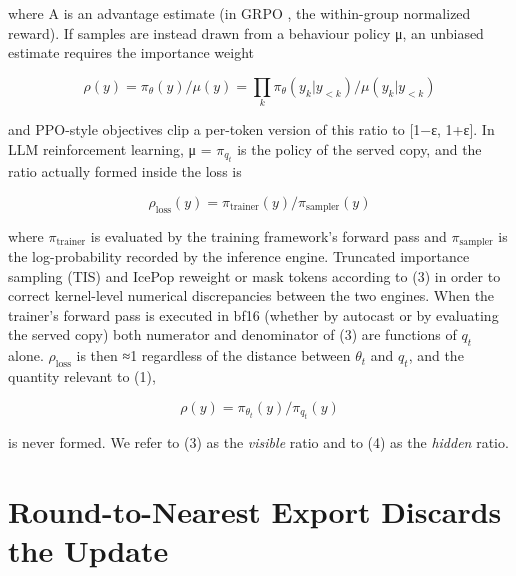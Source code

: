 \documentclass[
  10pt,
]{article}
\begin{document}
where A is an advantage estimate (in GRPO \cite{r16}, the within-group normalized reward). If
samples are instead drawn from a behaviour policy μ, an unbiased estimate requires the importance
weight

\begin{equation}
\rho(y) = \pi_{\theta }(y) / \mu(y) = \prod_{k} \pi_{\theta }(y_{k} | y_{<k}) / \mu(y_{k} | y_{<k})
\end{equation}

and PPO-style objectives \cite{r21} clip a per-token version of this ratio to {[}1−ε, 1+ε{]}. In LLM
reinforcement learning, μ = \(\pi_{q_t}\) is the policy of the served copy, and the ratio actually
formed inside the loss is

\begin{equation}
\rho_{\mathrm{loss}}(y) = \pi_{\mathrm{trainer}}(y) / \pi_{\mathrm{sampler}}(y)
\end{equation}

where \(\pi_{\mathrm{trainer}}\) is evaluated by the training framework's forward pass and
\(\pi_{\mathrm{sampler}}\) is the log-probability recorded by the inference engine. Truncated
importance sampling (TIS) \cite{r6} and IcePop \cite{r7} reweight or mask tokens according to (3) in
order to correct kernel-level numerical discrepancies between the two engines. When the trainer's
forward pass is executed in bf16 (whether by autocast \cite{r1} or by evaluating the served copy)
both numerator and denominator of (3) are functions of \(q_t\) alone. \(\rho_{\mathrm{loss}}\) is
then ≈1 regardless of the distance between \(\theta_t\) and \(q_t\), and the quantity relevant to
(1),

\begin{equation}
\rho(y) = \pi_{\theta_{t}}(y) / \pi_{q_{t}}(y)
\end{equation}

is never formed. We refer to (3) as the \emph{visible} ratio and to (4) as the \emph{hidden} ratio.

\section{Round-to-Nearest Export Discards the
Update}\label{round-to-nearest-export-discards-the-update}
\end{document}
